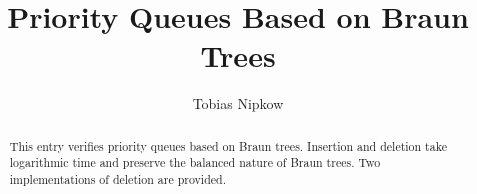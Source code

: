 \documentclass[11pt,a4paper]{article}
\begin{document}
\title{Priority Queues Based on Braun Trees}
\author{Tobias Nipkow}
\maketitle

\begin{abstract}
  This entry verifies priority queues based on Braun trees. Insertion
  and deletion take logarithmic time and preserve the balanced nature
  of Braun trees. Two implementations of deletion are provided.
\end{abstract}

\tableofcontents





\end{document}
